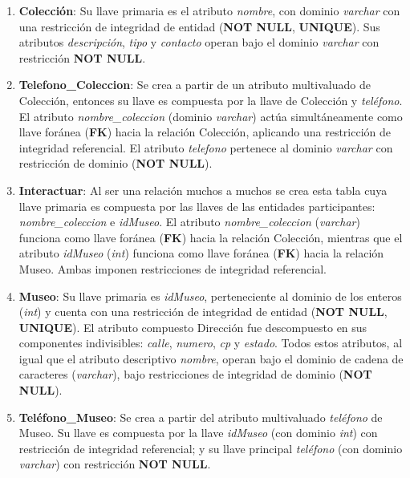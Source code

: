 
\begin{enumerate}

	\item \textbf{Colección}: Su llave primaria es el atributo \textit{nombre}, con dominio \textit{varchar} con una restricción de integridad de entidad (\textbf{NOT NULL}, \textbf{UNIQUE}). Sus atributos \textit{descripción}, \textit{tipo} y \textit{contacto} operan bajo el dominio \textit{varchar} con restricción \textbf{NOT NULL}.

	\item \textbf{Telefono\_Coleccion}: Se crea a partir de un atributo multivaluado de Colección, entonces su llave es compuesta por la llave de Colección y \textit{teléfono}. El atributo \textit{nombre\_coleccion} (dominio \textit{varchar}) actúa simultáneamente como llave foránea (\textbf{FK}) hacia la relación Colección, aplicando una restricción de integridad referencial. El atributo \textit{telefono} pertenece al dominio \textit{varchar} con restricción de dominio (\textbf{NOT NULL}).

	\item \textbf{Interactuar}: Al ser una relación muchos a muchos se crea esta tabla cuya llave primaria es compuesta por las llaves de las entidades participantes: \textit{nombre\_coleccion} e \textit{idMuseo}. El atributo \textit{nombre\_coleccion} (\textit{varchar}) funciona como llave foránea (\textbf{FK}) hacia la relación Colección, mientras que el atributo \textit{idMuseo} (\textit{int}) funciona como llave foránea (\textbf{FK}) hacia la relación Museo. Ambas imponen restricciones de integridad referencial.

	\item \textbf{Museo}: Su llave primaria es \textit{idMuseo}, perteneciente al dominio de los enteros (\textit{int}) y cuenta con una restricción de integridad de entidad (\textbf{NOT NULL}, \textbf{UNIQUE}). El atributo compuesto Dirección fue descompuesto en sus componentes indivisibles: \textit{calle}, \textit{numero}, \textit{cp} y \textit{estado}. Todos estos atributos, al igual que el atributo descriptivo \textit{nombre}, operan bajo el dominio de cadena de caracteres (\textit{varchar}), bajo restricciones de integridad de dominio (\textbf{NOT NULL}).

	\item \textbf{Teléfono\_Museo}: Se crea a partir del atributo multivaluado \textit{teléfono} de Museo. Su llave es compuesta por la llave \textit{idMuseo} (con dominio \textit{int}) con restricción de integridad referencial; y su llave principal \textit{teléfono} (con dominio \textit{varchar}) con restricción \textbf{NOT NULL}.


\end{enumerate}

